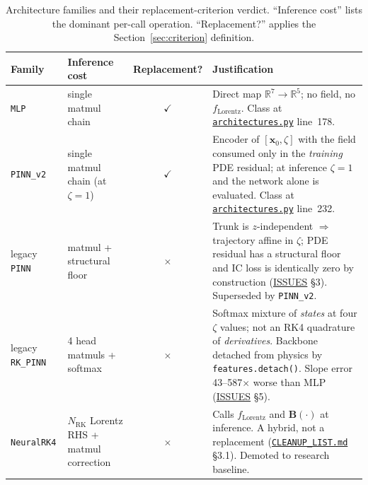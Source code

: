 \documentclass[11pt,a4paper]{article}
\newcommand{\Bfield}{\mathbf{B}}
\newcommand{\cmark}{\ensuremath{\checkmark}}
\newcommand{\xmark}{\ensuremath{\times}}
\begin{document}
\begin{table}[h!]
\centering
\caption{Architecture families and their replacement-criterion verdict.
``Inference cost'' lists the dominant per-call operation. ``Replacement?''
applies the Section~\ref{sec:criterion} definition.}
\label{tab:taxonomy}
\small
\begin{tabularx}{\linewidth}{l l c X}
\toprule
Family & Inference cost & Replacement? & Justification \\
\midrule
\texttt{MLP}
  & single matmul chain
  & \cmark
  & Direct map $\mathbb{R}^7\to\mathbb{R}^5$;
    no field, no $f_\mathrm{Lorentz}$. Class at
    \href{run:../../experiments/gen_3/models/architectures.py}{\texttt{architectures.py}}
    line~178. \\
\addlinespace
\texttt{PINN\_v2}
  & single matmul chain (at $\zeta=1$)
  & \cmark
  & Encoder of $[\mathbf{x}_0,\zeta]$ with the field consumed only in the
    \emph{training} PDE residual; at inference $\zeta=1$ and the network
    alone is evaluated. Class at
    \href{run:../../experiments/gen_3/models/architectures.py}{\texttt{architectures.py}}
    line~232. \\
\addlinespace
legacy \texttt{PINN}
  & matmul + structural floor
  & \xmark
  & Trunk is $z$-independent $\Rightarrow$ trajectory affine in $\zeta$;
    PDE residual has a structural floor and IC loss is identically zero by
    construction
    (\href{run:../../experiments/gen_2/ISSUES_WITH_PINNS_AND_RK_PINNS.md}{ISSUES} §3).
    Superseded by \texttt{PINN\_v2}. \\
\addlinespace
legacy \texttt{RK\_PINN}
  & 4 head matmuls + softmax
  & \xmark
  & Softmax mixture of \emph{states} at four $\zeta$ values; not an
    RK4 quadrature of \emph{derivatives}. Backbone detached from physics
    by \texttt{features.detach()}. Slope error 43--587$\times$ worse than
    MLP
    (\href{run:../../experiments/gen_2/ISSUES_WITH_PINNS_AND_RK_PINNS.md}{ISSUES} §5). \\
\addlinespace
\texttt{NeuralRK4}
  & $N_\mathrm{RK}$ Lorentz RHS + matmul correction
  & \xmark
  & Calls $f_\mathrm{Lorentz}$ and $\Bfield(\cdot)$ at inference. A
    hybrid, not a replacement
    (\href{run:../../experiments/gen_3/CLEANUP_LIST.md}{\texttt{CLEANUP\_LIST.md}} §3.1).
    Demoted to research baseline. \\
\bottomrule
\end{tabularx}
\end{table}
\end{document}
